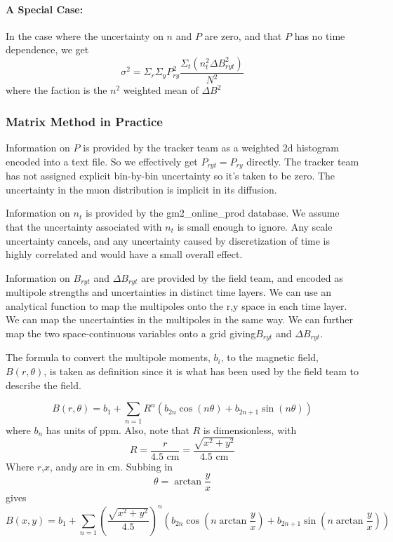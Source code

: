 \documentclass[twoside]{article}
\begin{document}
\paragraph{A Special Case:}
In the case where the uncertainty on $n$ and $P$ are zero, and that $P$ has no time dependence, we get
\begin{equation}
	\sigma^2 = 
	\Sigma_r \Sigma_y P^2_{ry} \frac{\Sigma_t  ( n^2_t \Delta B^2_{ryt})}{{N^2} }
\end{equation}
where the faction is the $n^2$ weighted mean of $\Delta B^2$

\subsubsection{Matrix Method in Practice}
Information on $P$ is provided by the tracker team as a weighted 2d histogram encoded into a text file. So we effectively get $P_{ryt} = P_{ry}$ directly. The tracker team has not assigned explicit bin-by-bin uncertainty so it's taken to be zero. The uncertainty in the muon distribution is implicit in its diffusion.

Information on $n_t$ is provided by the gm2\_online\_prod database. We assume that the uncertainty associated with $n_t$ is small enough to ignore. Any scale uncertainty cancels, and any uncertainty caused by discretization of time is highly correlated and would have a small overall effect.

Information on $B_{ryt}$ and $\Delta B_{ryt}$ are provided by the field team, and encoded as multipole strengths and uncertainties in distinct time layers.  We can use an analytical function to map the multipoles onto the {r,y} space in each time layer. We can map the uncertainties in the multipoles in the same way. We can further map the two space-continuous variables onto a grid giving$B_{ryt}$ and  $\Delta B_{ryt}$. 

The formula to convert the multipole moments, $b_i$, to the magnetic field, $B(r,\theta)$, is taken as definition since it is what has been used by the field team to describe the field.

\begin{equation}
B(r,\theta) =  b_1 +  \sum_{n=1} R^{n} (b_{2n} \cos(n \theta)  + b_{2n+1} \sin(n \theta )   )
\end{equation}
where $b_n$ has units of ppm. Also, note that $R$ is dimensionless, with 
\begin{equation}
R = \frac{r}{4.5 \text{ cm}}  = \frac{\sqrt{x^2 + y^2}}{4.5 \text{ cm}} 
\end{equation}
Where $r$,$x$, and$y$ are in cm. Subbing in 
\begin{equation}
\theta = \arctan \frac{y}{x}
\end{equation}
gives
\begin{equation}
B(x,y)  =  b_1 +  \sum_{n=1} (\frac{\sqrt{x^2 + y^2}}{4.5})^{n} (b_{2n} \cos(n \arctan \frac{y}{x})  + b_{2n+1} \sin(n  \arctan \frac{y}{x} )   )
\end{equation}
\end{document}
